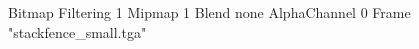 {Bitmap
	{Filtering 1}
	{Mipmap 1}
	{Blend none}
	{AlphaChannel 0}
	{Frame "stackfence_small.tga"}
}
